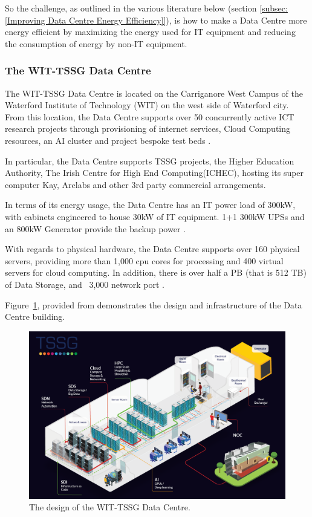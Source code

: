 \documentclass[12pt]{scrartcl}
\begin{document}
So the challenge, as outlined in the various literature below (section \ref{subsec:[Improving Data Centre Energy Efficiency]}), is how to make a Data Centre more energy efficient by maximizing the energy used for IT equipment and reducing the consumption of energy by non-IT equipment. 

\subsubsection{The WIT-TSSG Data Centre}
\label{subsubsec:[The WIT-TSSG Data Centre]}

The WIT-TSSG Data Centre is located on the Carriganore West Campus of the Waterford Institute of Technology (WIT) on the west side of Waterford city. From this location, the Data Centre supports over 50 concurrently active ICT research projects through provisioning of internet services, Cloud Computing resources, an AI cluster and project bespoke test beds \citep{TSSG}. 

In particular, the Data Centre supports TSSG projects, the Higher Education Authority, The Irish Centre for High End Computing(ICHEC), hosting its super computer Kay, Arclabs and other 3rd party commercial arrangements.

In terms of its energy usage, the Data Centre has an IT power load of 300kW, with cabinets engineered to house 30kW of IT equipment. 1+1 300kW UPSs and an 800kW Generator provide the backup power \citep{TSSG}.

With regards to physical hardware, the Data Centre supports over 160 physical servers, providing more than 1,000 cpu cores for processing and 400 virtual servers for cloud computing.  In addition, there is over half a PB (that is 512 TB) of Data Storage, and ~3,000 network port \citep{TSSG}. 

Figure~\ref{fig:TSSGdataCentreDesign}, provided from \citet{TSSG} demonstrates the design and infrastructure of the Data Centre building.  

\begin{figure}[h]
  \caption{The design of the WIT-TSSG Data Centre.}
  \label{fig:TSSGdataCentreDesign}
  \centering
    \includegraphics[scale=0.35]{TSSG_Diagram.png}
\end{figure}
\end{document}
